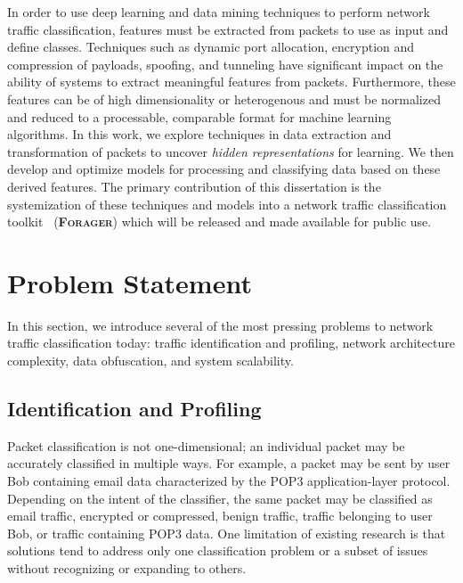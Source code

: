 In order to use deep learning and data mining techniques to perform network traffic classification, features must be extracted from packets to use as input and define classes. Techniques such as dynamic port allocation, encryption and compression of payloads, spoofing, and tunneling have significant impact on the ability of systems to extract meaningful features from packets. Furthermore, these features can be of high dimensionality or heterogenous and must be normalized and reduced to a processable, comparable format for machine learning algorithms. In this work, we explore techniques in data extraction and transformation of packets to uncover \textit{hidden representations} for learning. We then develop and optimize models for processing and classifying data based on these derived features. The primary contribution of this dissertation is the systemization of these techniques and models into a network traffic classification toolkit ~\textsc{(\textbf{Forager})} which will be released and made available for public use.

\section{Problem Statement}

In this section, we introduce several of the most pressing problems to network traffic classification today: traffic identification and profiling, network architecture complexity, data obfuscation, and system scalability.

\subsection{Identification and Profiling}

Packet classification is not one-dimensional; an individual packet may be accurately classified in multiple ways. For example, a packet may be sent by user Bob containing email data characterized by the POP3 application-layer protocol. Depending on the intent of the classifier, the same packet may be classified as email traffic, encrypted or compressed, benign traffic, traffic belonging to user Bob, or traffic containing POP3 data. One limitation of existing research is that solutions tend to address only one classification problem or a subset of issues without recognizing or expanding to others.

